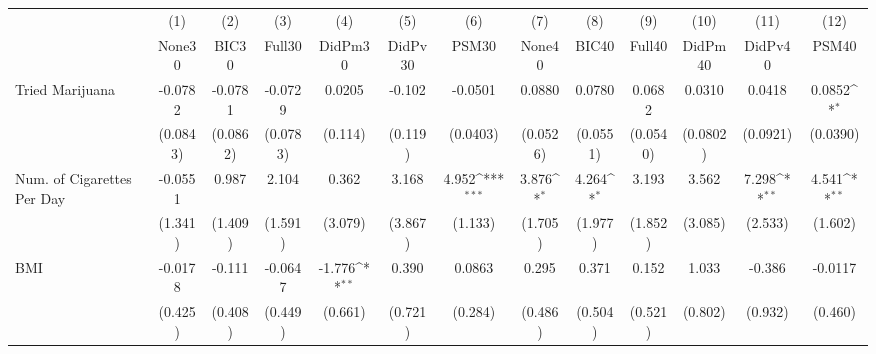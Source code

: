 {
\def\sym#1{\ifmmode^{#1}\else\(^{#1}\)\fi}
\begin{tabular}{l*{12}{c}}
\toprule
            &\multicolumn{1}{c}{(1)}&\multicolumn{1}{c}{(2)}&\multicolumn{1}{c}{(3)}&\multicolumn{1}{c}{(4)}&\multicolumn{1}{c}{(5)}&\multicolumn{1}{c}{(6)}&\multicolumn{1}{c}{(7)}&\multicolumn{1}{c}{(8)}&\multicolumn{1}{c}{(9)}&\multicolumn{1}{c}{(10)}&\multicolumn{1}{c}{(11)}&\multicolumn{1}{c}{(12)}\\
            &\multicolumn{1}{c}{None30}&\multicolumn{1}{c}{BIC30}&\multicolumn{1}{c}{Full30}&\multicolumn{1}{c}{DidPm30}&\multicolumn{1}{c}{DidPv30}&\multicolumn{1}{c}{PSM30}&\multicolumn{1}{c}{None40}&\multicolumn{1}{c}{BIC40}&\multicolumn{1}{c}{Full40}&\multicolumn{1}{c}{DidPm40}&\multicolumn{1}{c}{DidPv40}&\multicolumn{1}{c}{PSM40}\\
\midrule
Tried Marijuana&     -0.0782         &     -0.0781         &     -0.0729         &      0.0205         &      -0.102         &     -0.0501         &      0.0880         &      0.0780         &      0.0682         &      0.0310         &      0.0418         &      0.0852\sym{*}  \\
            &    (0.0843)         &    (0.0862)         &    (0.0783)         &     (0.114)         &     (0.119)         &    (0.0403)         &    (0.0526)         &    (0.0551)         &    (0.0540)         &    (0.0802)         &    (0.0921)         &    (0.0390)         \\
\addlinespace
Num. of Cigarettes Per Day&     -0.0551         &       0.987         &       2.104         &       0.362         &       3.168         &       4.952\sym{***}&       3.876\sym{*}  &       4.264\sym{*}  &       3.193         &       3.562         &       7.298\sym{**} &       4.541\sym{**} \\
            &     (1.341)         &     (1.409)         &     (1.591)         &     (3.079)         &     (3.867)         &     (1.133)         &     (1.705)         &     (1.977)         &     (1.852)         &     (3.085)         &     (2.533)         &     (1.602)         \\
\addlinespace
BMI         &     -0.0178         &      -0.111         &     -0.0647         &      -1.776\sym{**} &       0.390         &      0.0863         &       0.295         &       0.371         &       0.152         &       1.033         &      -0.386         &     -0.0117         \\
            &     (0.425)         &     (0.408)         &     (0.449)         &     (0.661)         &     (0.721)         &     (0.284)         &     (0.486)         &     (0.504)         &     (0.521)         &     (0.802)         &     (0.932)         &     (0.460)         \\

\end{tabular}}
